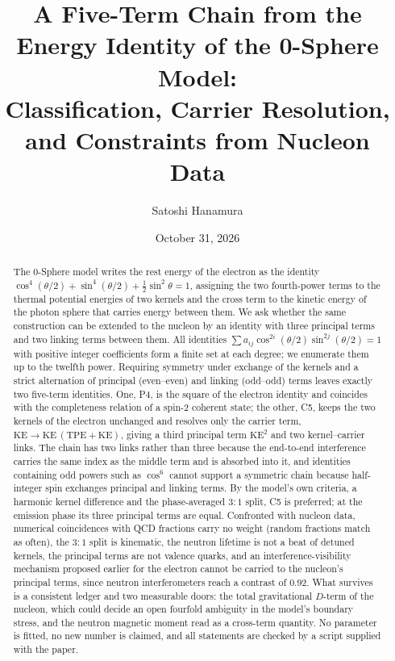\documentclass[%
 reprint, amsmath,amssymb, aps, prb, ]{revtex4-2}
\numberwithin{equation}{section}
\begin{document}
\title{A Five-Term Chain from the Energy Identity of the 0-Sphere Model:\\ Classification, Carrier Resolution, and Constraints from Nucleon Data}

\author{Satoshi Hanamura}

\date{October 31, 2026}

\begin{abstract}
The 0-Sphere model writes the rest energy of the electron as the identity $\cos^4(\theta/2)+\sin^4(\theta/2)+\tfrac12\sin^2\theta=1$, assigning the two fourth-power terms to the thermal potential energies of two kernels and the cross term to the kinetic energy of the photon sphere that carries energy between them.
We ask whether the same construction can be extended to the nucleon by an identity with three principal terms and two linking terms between them.
All identities $\sum a_{ij}\cos^{2i}(\theta/2)\sin^{2j}(\theta/2)=1$ with positive integer coefficients form a finite set at each degree; we enumerate them up to the twelfth power.
Requiring symmetry under exchange of the kernels and a strict alternation of principal (even--even) and linking (odd--odd) terms leaves exactly two five-term identities.
One, P4, is the square of the electron identity and coincides with the completeness relation of a spin-2 coherent state; the other, C5, keeps the two kernels of the electron unchanged and resolves only the carrier term, $\mathrm{KE}\to\mathrm{KE}\,(\mathrm{TPE}+\mathrm{KE})$, giving a third principal term $\mathrm{KE}^2$ and two kernel--carrier links.
The chain has two links rather than three because the end-to-end interference carries the same index as the middle term and is absorbed into it, and identities containing odd powers such as $\cos^6$ cannot support a symmetric chain because half-integer spin exchanges principal and linking terms.
By the model's own criteria, a harmonic kernel difference and the phase-averaged $3{:}1$ split, C5 is preferred; at the emission phase its three principal terms are equal.
Confronted with nucleon data, numerical coincidences with QCD fractions carry no weight (random fractions match as often), the $3{:}1$ split is kinematic, the neutron lifetime is not a beat of detuned kernels, the principal terms are not valence quarks, and an interference-visibility mechanism proposed earlier for the electron cannot be carried to the nucleon's principal terms, since neutron interferometers reach a contrast of $0.92$.
What survives is a consistent ledger and two measurable doors: the total gravitational $D$-term of the nucleon, which could decide an open fourfold ambiguity in the model's boundary stress, and the neutron magnetic moment read as a cross-term quantity.
No parameter is fitted, no new number is claimed, and all statements are checked by a script supplied with the paper.
\end{abstract}
\end{document}
